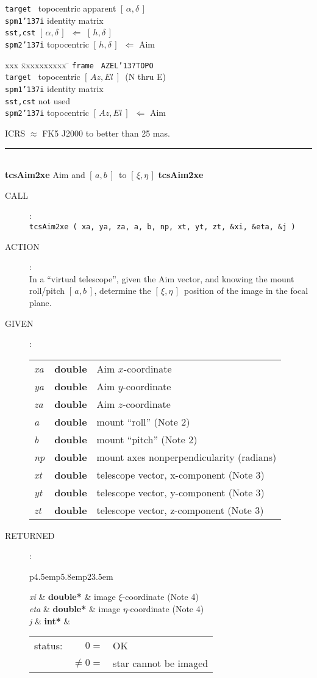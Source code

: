 \documentclass[12pt,fleqn,twoside]{article}
\renewcommand{\_}{{\tt\char'137}}     %
\newcommand{\radec}     {$[\,\alpha,\delta\,]$}
\newcommand{\hadec}     {$[\,h,\delta\,]$}
\newcommand{\xieta}     {$[\,\xi,\eta\,]$}
\newcommand{\azel}      {$[\,Az,El~]$}
\newcommand{\ab}         {$[\,a,b~]$}
\newcommand{\routine}[2]
{
  \newpage
  \rule{\textwidth}{0.3mm}\\ \nopagebreak
  {\Large {\bf #1} \hfill #2 \hfill {\bf #1}}
  \vspace{-1ex}
}
\newcommand{\call}[1]
{
  \goodbreak
  \begin{description}
    \item[CALL]: \\[0.5ex] \nopagebreak
        {\tt #1}
  \end{description}
  \vspace{-3ex}
}
\newcommand{\action}[1]
{
  \goodbreak
  \begin{description}
    \item[ACTION]: \\[0.5ex] \nopagebreak
        #1
  \end{description}
  \vspace{-3ex}
}
\newcommand{\args}[2]
{
  \goodbreak
  \begin{description}
  \item[#1]: \\[1.5ex] \nopagebreak
    \hspace*{-0.9em}
    \begin{tabular}{p{4.5em}p{5.8em}p{23.5em}}
      #2
    \end{tabular}
  \end{description}
  \vspace{-3ex}
}
\newcommand{\spec}[3]
{
  {\em {#1}} & {\bf \mbox{#2}} & {#3}
}
\begin{document}
{\begin{enumerate}
\begin{tabbing}
         \> {\tt target } \> topocentric apparent \radec \\
         \> {\tt spm1\_i} \> identity matrix \\
         \> {\tt sst,cst} \> \radec\ $\Leftarrow$ \hadec \\
         \> {\tt spm2\_i} \> topocentric \hadec\ $\Leftarrow$ {\sc Aim}
      \end{tabbing}
      \begin{tabbing}
         xxx \= xxxxxxxxxx \= \kill
         \> {\tt frame  } \> {\tt AZEL\_TOPO} \\
         \> {\tt target } \> topocentric \azel\ (N thru E) \\
         \> {\tt spm1\_i} \> identity matrix \\
         \> {\tt sst,cst} \> not used \\
         \> {\tt spm2\_i} \> topocentric \azel\ $\Leftarrow$ {\sc Aim}
      \end{tabbing}

      ICRS $\approx$ FK5 J2000 to better than 25 mas.
\end{enumerate}
}
\routine{tcsAim2xe}{{\sc Aim} and \ab\ to \xieta}
\label{tcsAim2xe}
\call{tcsAim2xe ( xa, ya, za, a, b, np, xt, yt, zt, \&xi, \&eta, \&j )}
\action{In a ``virtual telescope'', given the {\sc Aim} vector,
        and knowing the mount roll/pitch \ab, determine the
        \xieta\ position of the image in the focal plane.}
\args{GIVEN}
{
\spec{xa}{double}{{\sc Aim} $x$-coordinate} \\
\spec{ya}{double}{{\sc Aim} $y$-coordinate} \\
\spec{za}{double}{{\sc Aim} $z$-coordinate} \\
\spec{a}{double}{mount ``roll'' (Note 2)} \\
\spec{b}{double}{mount ``pitch'' (Note 2)} \\
\spec{np}{double}{mount axes nonperpendicularity (radians)} \\
\spec{xt}{double}{telescope vector, x-component (Note 3)} \\
\spec{yt}{double}{telescope vector, y-component (Note 3)} \\
\spec{zt}{double}{telescope vector, z-component (Note 3)}
}
\args{RETURNED}
{
\spec{xi}{double*}{image $\xi$-coordinate (Note 4)} \\
\spec{eta}{double*}{image $\eta$-coordinate (Note 4)} \\
\spec{j}{int*}{\hspace{-2ex}
               \begin{tabular}[t]{lrl}
                  status: & $  0 = $ & OK \\
                          & $ \neq 0 = $ & star cannot be imaged
               \end{tabular}
              }
}
\end{document}

